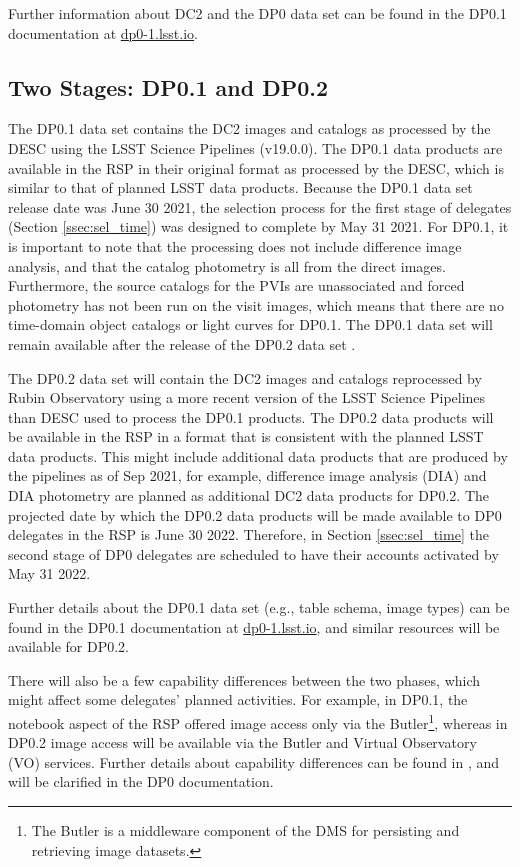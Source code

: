 \documentclass[DM,lsstdraft,authoryear,toc]{lsstdoc}
\begin{document}
Further information about DC2 and the DP0 data set can be found in the DP0.1 documentation at \url{dp0-1.lsst.io}.


\subsection{Two Stages: DP0.1 and DP0.2}\label{ssec:intro_stages}

The DP0.1 data set contains the DC2 images and catalogs as processed by the DESC using the LSST Science Pipelines (v19.0.0).
The DP0.1 data products are available in the RSP in their original format as processed by the DESC, which is similar to that of planned LSST data products.
Because the DP0.1 data set release date was June 30 2021, the selection process for the first stage of delegates (Section \ref{ssec:sel_time}) was designed to complete by May 31 2021.
For DP0.1, it is important to note that the processing does not include difference image analysis, and that the catalog photometry is all from the direct images.
Furthermore, the source catalogs for the PVIs are unassociated and forced photometry has not been run on the visit images, which means that there are no time-domain object catalogs or light curves for DP0.1.
The DP0.1 data set will remain available after the release of the DP0.2 data set .

The DP0.2 data set will contain the DC2 images and catalogs reprocessed by Rubin Observatory using a more recent version of the LSST Science Pipelines than DESC used to process the DP0.1 products.
The DP0.2 data products will be available in the RSP in a format that is consistent with the planned LSST data products.
This might include additional data products that are produced by the pipelines as of Sep 2021, for example, difference image analysis (DIA) and DIA photometry are planned as additional DC2 data products for DP0.2.
The projected date by which the DP0.2 data products will be made available to DP0 delegates in the RSP is June 30 2022. 
Therefore, in Section \ref{ssec:sel_time} the second stage of DP0 delegates are scheduled to have their accounts activated by May 31 2022.

Further details about the DP0.1 data set (e.g., table schema, image types) can be found in the DP0.1 documentation at \url{dp0-1.lsst.io}, and similar resources will be available for DP0.2.

There will also be a few capability differences between the two phases, which might affect some delegates' planned activities.
For example, in DP0.1, the notebook aspect of the RSP offered image access only via the Butler\footnote{The Butler is a middleware component of the DMS for persisting and retrieving image datasets.}, whereas in DP0.2 image access will be available via the Butler and Virtual Observatory (VO) services.
Further details about capability differences can be found in , and will be clarified in the DP0 documentation.
\end{document}
